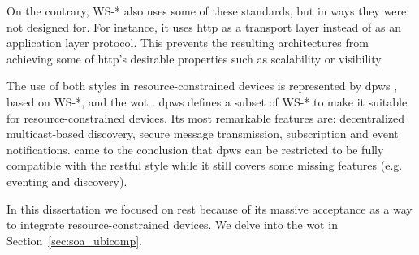 On the contrary, WS-* also uses some of these standards, but in ways they were not designed for.
For instance, it uses \ac{http} as a transport layer instead of as an application layer protocol.
This prevents the resulting architectures from achieving some of \ac{http}'s desirable properties such as scalability or visibility.


\bigskip


The use of both styles in resource-constrained devices is represented by
\ac{dpws} \citep{moritz_devices_2010}, based on WS-*, and the \ac{wot} \citep{guinard_internet_2011}. %
\ac{dpws} defines a subset of WS-* to make it suitable for resource-constrained devices.
Its most remarkable features are: decentralized multicast-based discovery, secure message transmission, subscription and event notifications.
\citeauthor{moritz_devices_2010} came to the conclusion that \ac{dpws} can be restricted to be fully compatible with the \ac{rest}ful style while it still covers some missing features (e.g. eventing and discovery).


In this dissertation we focused on \ac{rest} because of its massive acceptance as a way to integrate resource-constrained devices. %
We delve into the \ac{wot} in Section~\ref{sec:soa_ubicomp}. %